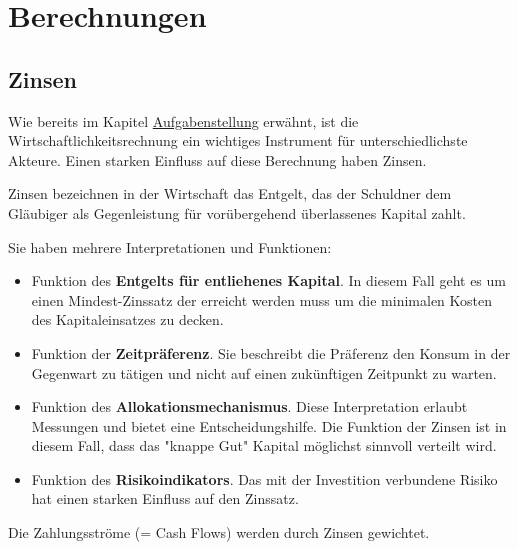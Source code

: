 \documentclass[a4paper,12pt]{article}
\begin{document}
	\section{Berechnungen}
	\label{sec:Berechnungen}
	\subsection{Zinsen}
	Wie bereits im Kapitel \hyperref[sec:Aufgabenstellung]{Aufgabenstellung} erwähnt, ist die Wirtschaftlichkeitsrechnung ein wichtiges Instrument für unterschiedlichste Akteure.\newline
	Einen starken Einfluss auf diese Berechnung haben Zinsen.\\ \par
	\noindent Zinsen bezeichnen in der Wirtschaft das Entgelt, das der Schuldner dem Gläubiger als Gegenleistung für vorübergehend überlassenes Kapital zahlt.\\ \par
	\noindent Sie haben mehrere Interpretationen und Funktionen:
	\begin{itemize}
		\item Funktion des \textbf{Entgelts für entliehenes Kapital}. In diesem Fall geht es um einen Mindest-Zinssatz der erreicht werden muss um die minimalen Kosten des Kapitaleinsatzes zu decken.
		\item Funktion der \textbf{Zeitpräferenz}. Sie beschreibt die Präferenz den Konsum in der Gegenwart zu tätigen und nicht auf einen zukünftigen Zeitpunkt zu warten.
		\item Funktion des \textbf{Allokationsmechanismus}. Diese Interpretation erlaubt Messungen und bietet eine Entscheidungshilfe. Die Funktion der Zinsen ist in diesem Fall, dass das "knappe Gut" Kapital möglichst sinnvoll verteilt wird.
		\item Funktion des \textbf{Risikoindikators}. Das mit der Investition verbundene Risiko hat einen starken Einfluss auf den Zinssatz.
	\end{itemize}
	Die Zahlungsströme (= Cash Flows) werden durch Zinsen gewichtet.
\end{document}
